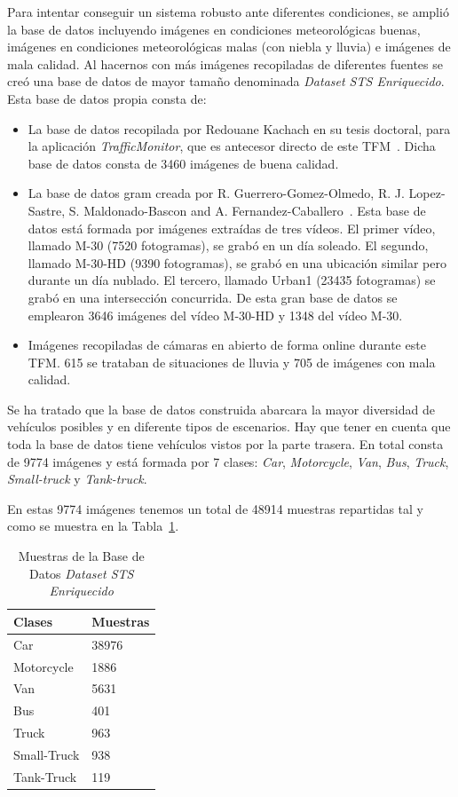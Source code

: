 Para intentar conseguir un sistema robusto ante diferentes condiciones, se amplió la base de datos incluyendo imágenes en condiciones meteorológicas buenas, imágenes en condiciones meteorológicas malas (con niebla y lluvia) e imágenes de mala calidad. Al hacernos con más imágenes recopiladas de diferentes fuentes se creó una base de datos de mayor tamaño denominada \textit{Dataset STS Enriquecido}. Esta base de datos propia consta de:
\begin{itemize}
    \item La base de datos recopilada por Redouane Kachach en su tesis doctoral, para la aplicación \textit{TrafficMonitor}, que es antecesor directo de este TFM~\cite{traffic_monitor_lab}. Dicha base de datos consta de 3460 imágenes de buena calidad.
    \item La base de datos \acrfull{gram} creada por R. Guerrero-Gomez-Olmedo, R. J. Lopez-Sastre, S. Maldonado-Bascon and A. Fernandez-Caballero~\cite{guerrero2013iwinac}. Esta base de datos está formada por imágenes extraídas de tres vídeos. El primer vídeo, llamado M-30 (7520 fotogramas), se grabó en un día soleado. El segundo, llamado M-30-HD (9390 fotogramas), se grabó en una ubicación similar pero durante un día nublado. El tercero, llamado Urban1 (23435 fotogramas) se grabó en una intersección concurrida. De esta gran base de datos se emplearon 3646 imágenes del vídeo M-30-HD y 1348 del vídeo M-30.
    \item Imágenes recopiladas de cámaras en abierto de forma online durante este TFM. 615 se trataban de situaciones de lluvia y 705 de imágenes con mala calidad.
\end{itemize} 

Se ha tratado que la base de datos construida abarcara la mayor diversidad de vehículos posibles y en diferente tipos de escenarios. Hay que tener en cuenta que toda la base de datos tiene vehículos vistos por la parte trasera. En total consta de 9774 imágenes y está formada por 7 clases: \textit{Car}, \textit{Motorcycle}, \textit{Van}, \textit{Bus}, \textit{Truck}, \textit{Small-truck} y \textit{Tank-truck}.


En estas 9774 imágenes tenemos un total de 48914 muestras repartidas tal y como se muestra en la Tabla~\ref{tabla_muestras}.

\begin{table}[htbp] 
\begin{center}
\begin{tabular}{|l|l|}
\hline
Clases & Muestras \\
\hline \hline
Car & 38976 \\ \hline
Motorcycle & 1886 \\ \hline
Van & 5631 \\ \hline
Bus & 401 \\ \hline
Truck & 963 \\ \hline
Small-Truck & 938 \\ \hline
Tank-Truck & 119 \\ \hline
\end{tabular}
\caption{Muestras de la Base de Datos \textit{Dataset STS Enriquecido}}
\label{tabla_muestras}
\end{center}
\end{table}

